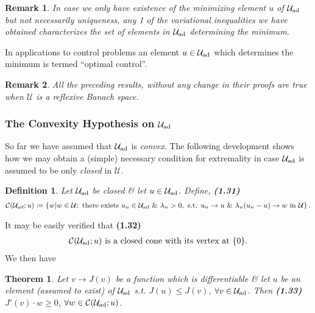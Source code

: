 \documentclass[oneside]{book}
\numberwithin{equation}{section}
\newtheorem{definition}{Definition}[chapter]
\newtheorem{remark}{Remark}[chapter]
\newtheorem{theorem}{Theorem}[chapter]
\begin{document}
\begin{remark}
	In case we only have existence of the minimizing element $u$ of $\mathcal{U}_{\rm ad}$ but not necessarily uniqueness, any 1 of the variational inequalities we have obtained characterizes the set of elements in $\mathcal{U}_{\rm ad}$ determining the minimum.
\end{remark}
In applications to control problems an element $u\in\mathcal{U}_{\rm ad}$ which determines the minimum is termed ``optimal control''.

\begin{remark}
	All the preceding results, without any change in their proofs are true when $\mathcal{U}$ is a reflexive Banach space.
\end{remark}

\subsubsection{The Convexity Hypothesis on $\mathcal{U}_{\rm ad}$}
So far we have assumed that $\mathcal{U}_{\rm ad}$ is \textit{convex}. The following development shows how we may obtain a (simple) necessary condition for extremality in case $\mathcal{U}_{\rm ad}$ is assumed to be only \textit{closed} in $\mathcal{U}$.

\begin{definition}
	Let $\mathcal{U}_{\rm ad}$ be closed \& let $u\in\mathcal{U}_{\rm ad}$. Define, \textbf{(1.31)}
	\begin{align*}
		\mathcal{C}(\mathcal{U}_{\rm ad};u)\coloneqq\left\{w|w\in\mathcal{U};\mbox{ there exists } u_n\in\mathcal{U}_{\rm ad}\mbox{ \& }\lambda_n > 0,\mbox{ s.t. } u_n\to u\mbox{ \& }\lambda_n(u_n - u)\to w\mbox{ in }\mathcal{U}\right\}.
	\end{align*}
\end{definition}
It may be easily verified that \textbf{(1.32)}
\begin{align*}
	\mathcal{C}(\mathcal{U}_{\rm ad};u)\mbox{ is a closed cone with its vertex at }\{0\}.
\end{align*}
We then have

\begin{theorem}
	Let $v\to J(v)$ be a function which is differentiable \& let $u$ be an element (assumed to exist) of $\mathcal{U}_{\rm ad}$ s.t. $J(u)\le J(v)$, $\forall v\in\mathcal{U}_{\rm ad}$. Then \textbf{(1.33)} $J'(v)\cdot w\ge 0$, $\forall w\in\mathcal{C}(\mathcal{U}_{\rm ad};u)$.
\end{theorem}
\end{document}
